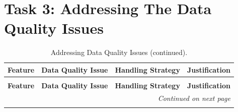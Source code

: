 \documentclass[11pt]{report}
\begin{document}
\section*{Task 3: Addressing The Data Quality Issues}

\begin{longtable}{lp{4cm}p{4cm}p{5cm}}

\caption{Addressing Data Quality Issues.}
\label{tab:address_data_quality_issues} \\
\toprule
\textbf{Feature} & \textbf{Data Quality Issue} & \textbf{Handling Strategy} & \textbf{Justification} \\
\midrule
\endfirsthead

\caption[]{Addressing Data Quality Issues (continued).} \\
\toprule
\textbf{Feature} & \textbf{Data Quality Issue} & \textbf{Handling Strategy} & \textbf{Justification} \\
\midrule
\endhead

\multicolumn{4}{r}{\textit{Continued on next page}} \\
\endfoot

\bottomrule
\endlastfoot


\end{longtable}
\end{document}
